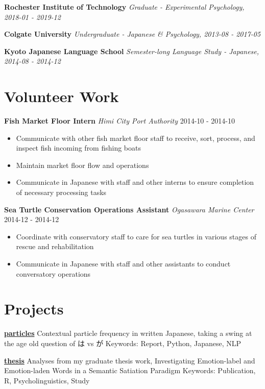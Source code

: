 \documentclass[a4paper,9pt]{extarticle}
\begin{document}
\noindent
\textbf{Rochester Institute of Technology}
\textit{Graduate - Experimental Psychology, 2018-01 - 2019-12}

\noindent
\textbf{Colgate University}
\textit{Undergraduate - Japanese \& Psychology, 2013-08 - 2017-05}

\noindent
\textbf{Kyoto Japanese Language School}
\textit{Semester-long Language Study - Japanese, 2014-08 - 2014-12}



\section*{Volunteer Work}

\noindent
\textbf{Fish Market Floor Intern}
\noindent
\textit{Himi City Port Authority} \hfill 2014-10 - 2014-10
\begin{itemize}

\item Communicate with other fish market floor staff to receive, sort, process, and inspect fish incoming from fishing boats
\item Maintain market floor flow and operations
\item Communicate in Japanese with staff and other interns to ensure completion of necessary processing tasks
\end{itemize}

\noindent
\textbf{Sea Turtle Conservation Operations Assistant}
\noindent
\textit{Ogasawara Marine Center} \hfill 2014-12 - 2014-12
\begin{itemize}

\item Coordinate with conservatory staff to care for sea turtles in various stages of rescue and rehabilitation
\item Communicate in Japanese with staff and other assistants to conduct conversatory operations
\end{itemize}



\section*{Projects}

\noindent
\textbf{\href{https://github.com/ryancahildebrandt/particles}{particles}}
Contextual particle frequency in written Japanese, taking a swing at the age old question of は vs が
Keywords: Report, Python, Japanese, NLP

\noindent
\textbf{\href{https://github.com/ryancahildebrandt/thesis}{thesis}}
Analyses from my graduate thesis work, Investigating Emotion-label and Emotion-laden Words in a Semantic Satiation Paradigm
Keywords: Publication, R, Psycholinguistics, Study
\end{document}
